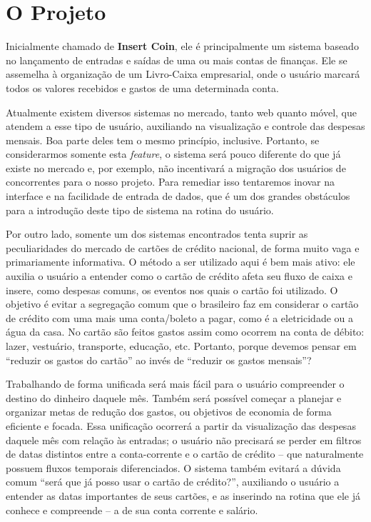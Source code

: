 \documentclass[a4paper]{abnt}
\begin{document}
\section{O Projeto}

Inicialmente chamado de \textbf{Insert Coin}, ele é principalmente um sistema baseado no lançamento de entradas e saídas de uma ou mais contas de finanças. Ele se assemelha à organização de um Livro-Caixa empresarial, onde o usuário marcará todos os valores recebidos e gastos de uma determinada conta. 

Atualmente existem diversos sistemas no mercado, tanto web quanto móvel, que atendem a esse tipo de usuário, auxiliando na visualização e controle das despesas mensais. Boa parte deles tem o mesmo princípio, inclusive. Portanto, se considerarmos somente esta \emph{feature}, o sistema será pouco diferente do que já existe no mercado e, por exemplo, não incentivará a migração dos usuários de concorrentes para o nosso projeto. Para remediar isso tentaremos inovar na interface e na facilidade de entrada de dados, que é um dos grandes obstáculos para a introdução deste tipo de sistema na rotina do usuário.

Por outro lado, somente um dos sistemas encontrados tenta suprir as peculiaridades do mercado de cartões de crédito nacional, de forma muito vaga e primariamente informativa. O método a ser utilizado aqui é bem mais ativo: ele auxilia o usuário a entender como o cartão de crédito afeta seu fluxo de caixa e insere, como despesas comuns, os eventos nos quais o cartão foi utilizado. O objetivo é evitar a segregação comum que o brasileiro faz em considerar o cartão de crédito com uma mais uma conta/boleto a pagar, como é a eletricidade ou a água da casa. No cartão são feitos gastos assim como ocorrem na conta de débito: lazer, vestuário, transporte, educação, etc. Portanto, porque devemos pensar em ``reduzir os gastos do cartão'' ao invés de ``reduzir os gastos mensais''?

Trabalhando de forma unificada será mais fácil para o usuário compreender o destino do dinheiro daquele mês. Também será possível começar a planejar e organizar metas de redução dos gastos, ou objetivos de economia de forma eficiente e focada. Essa unificação ocorrerá a partir da visualização das despesas daquele mês com relação às entradas; o usuário não precisará se perder em filtros de datas distintos entre a conta-corrente e o cartão de crédito -- que naturalmente possuem fluxos temporais diferenciados. O sistema também evitará a dúvida comum ``será que já posso usar o cartão de crédito?'', auxiliando o usuário a entender as datas importantes de seus cartões, e as inserindo na rotina que ele já conhece e compreende -- a de sua conta corrente e salário.
\end{document}
